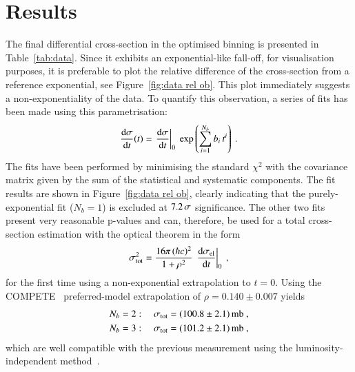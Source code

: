 \section{Results}


The final differential cross-section in the optimised binning is presented in Table~\ref{tab:data}. Since it exhibits an exponential-like fall-off, for visualisation purposes, it is preferable to plot the relative difference of the cross-section from a reference exponential, %
see Figure~\ref{fig:data rel ob}. This plot immediately suggests a non-exponentiality of the data. To quantify this observation, a series of fits has been made using this parametrisation:
\begin{equation}
\label{fit param}
{{\rm d}\sigma\over{\rm d}t}(t) = \left. {\rm d}\sigma\over{\rm d} t\right|_{0} \ \exp\left( \sum\limits_{i = 1}^{N_{b}} b_i\, t^i \right) \:.
\end{equation}
The fits have been performed by minimising the standard $\chi^2$ with the covariance matrix given by the sum of the statistical and systematic components. The fit results are shown in Figure~\ref{fig:data rel ob}, clearly indicating that the purely-exponential fit ($N_b = 1$) is excluded at $7.2\,{\rm \sigma}$ significance. The other two fits present very reasonable p-values and can, therefore, be used for a total cross-section estimation with the optical theorem in the form
\begin{equation}
\label{eq:si tot}
\sigma_{\rm tot}^2 = {16\pi\, (\hbar c)^2\over 1 + \rho^2}\, \left. {\rm d}\sigma_{\rm el}\over{\rm d} t\right|_0\ ,
\end{equation}
for the first time using a non-exponential extrapolation to $t=0$. Using the COMPETE~\cite{compete} preferred-model extrapolation of $\rho = 0.140\pm 0.007$ yields
\begin{equation}
\label{eq:si tot results}
	\begin{aligned}
		N_b &= 2:\quad \sigma_{\rm tot} = (100.8 \pm 2.1)\un{mb}\ ,\\	%
		N_b &= 3:\quad \sigma_{\rm tot} = (101.2 \pm 2.1)\un{mb}\ ,\\	%
	\end{aligned}
\end{equation}
which are well compatible with the previous measurement using the luminosity-independent method~\cite{prl111}.




